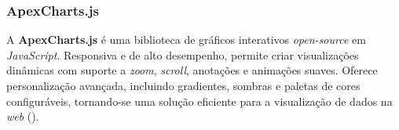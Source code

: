 \subsubsection{ApexCharts.js}

A \textbf{ApexCharts.js} é uma biblioteca de gráficos interativos \textit{open-source} em \textit{JavaScript}. Responsiva e de alto desempenho, permite criar visualizações dinâmicas com suporte a \textit{zoom}, \textit{scroll}, anotações e animações suaves. Oferece personalização avançada, incluindo gradientes, sombras e paletas de cores configuráveis, tornando-se uma solução eficiente para a visualização de dados na \textit{web} (\cite{Apexcharts2025}).


 \vspace{20mm}